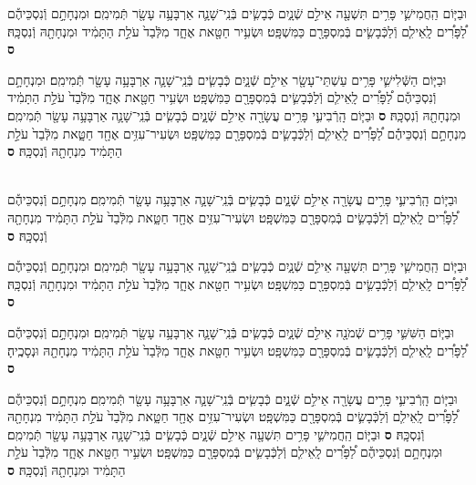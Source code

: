 \documentclass[twoside, openany, parskip=half, 11pt]{book}
\begin{document}
\begin{sometimes}
\begin{footnotesize}
\begin{multicols}{2}
וּבַיּ֧וֹם הַֽחֲמִישִׁ֛י פָּרִ֥ים תִּשְׁעָ֖ה אֵילִ֣ם שְֿׁנָ֑יִם כְּֿבָשִׂ֧ים בְּֿנֵֽי־שָׁנָ֛ה אַרְבָּעָ֥ה עָשָׂ֖ר תְּֿמִימִֽם׃ וּמִנְחָתָ֣ם וְֿנִסְכֵּיהֶ֡ם לַ֠פָּרִ֠ים לָֽאֵילִ֧ם וְֿלַכְּֿבָשִׂ֛ים בְּֿמִסְפָּרָ֖ם כַּמִּשְׁפָּֽט׃ וּשְׂעִ֥יר חַטָּ֖את אֶחָ֑ד מִלְּֿבַד֙ עֹלַ֣ת הַתָּמִ֔יד וּמִנְחָתָ֖הּ וְֿנִסְכָּֽהּ׃ \textbf{ס}

וּבַיּ֧וֹם הַשְּֿׁלִישִׁ֛י פָּרִ֥ים עַשְׁתֵּי־עָשָׂ֖ר אֵילִ֣ם שְֿׁנָ֑יִם כְּֿבָשִׂ֧ים בְּֿנֵֽי־שָׁנָ֛ה אַרְבָּעָ֥ה עָשָׂ֖ר תְּֿמִימִֽם׃ וּמִנְחָתָ֣ם וְֿנִסְכֵּיהֶ֡ם לַ֠פָּרִ֠ים לָֽאֵילִ֧ם וְֿלַכְּֿבָשִׂ֛ים בְּֿמִסְפָּרָ֖ם כַּמִּשְׁפָּֽט׃ וּשְׂעִ֥יר חַטָּ֖את אֶחָ֑ד מִלְּֿבַד֙ עֹלַ֣ת הַתָּמִ֔יד וּמִנְחָתָ֖הּ וְֿנִסְכָּֽהּ׃ \textbf{ס}
וּבַיּ֧וֹם הָֽרְֿבִיעִ֛י פָּרִ֥ים עֲשָׂרָ֖ה אֵילִ֣ם שְֿׁנָ֑יִם כְּֿבָשִׂ֧ים בְּֿנֵֽי־שָׁנָ֛ה אַרְבָּעָ֥ה עָשָׂ֖ר תְּֿמִימִֽם׃ מִנְחָתָ֣ם וְֿנִסְכֵּיהֶ֡ם לַ֠פָּרִ֠ים לָֽאֵילִ֧ם וְֿלַכְּֿבָשִׂ֛ים בְּֿמִסְפָּרָ֖ם כַּמִּשְׁפָּֽט׃ וּשְׂעִיר־עִזִּ֥ים אֶחָ֖ד חַטָּ֑את מִלְּֿבַד֙ עֹלַ֣ת הַתָּמִ֔יד מִנְחָתָ֖הּ וְֿנִסְכָּֽהּ׃ \textbf{ס}

\\
וּבַיּ֧וֹם הָֽרְֿבִיעִ֛י פָּרִ֥ים עֲשָׂרָ֖ה אֵילִ֣ם שְֿׁנָ֑יִם כְּֿבָשִׂ֧ים בְּֿנֵֽי־שָׁנָ֛ה אַרְבָּעָ֥ה עָשָׂ֖ר תְּֿמִימִֽם׃ מִנְחָתָ֣ם וְֿנִסְכֵּיהֶ֡ם לַ֠פָּרִ֠ים לָֽאֵילִ֧ם וְֿלַכְּֿבָשִׂ֛ים בְּֿמִסְפָּרָ֖ם כַּמִּשְׁפָּֽט׃ וּשְׂעִיר־עִזִּ֥ים אֶחָ֖ד חַטָּ֑את מִלְּֿבַד֙ עֹלַ֣ת הַתָּמִ֔יד מִנְחָתָ֖הּ וְֿנִסְכָּֽהּ׃ \textbf{ס}

וּבַיּ֧וֹם הַֽחֲמִישִׁ֛י פָּרִ֥ים תִּשְׁעָ֖ה אֵילִ֣ם שְֿׁנָ֑יִם כְּֿבָשִׂ֧ים בְּֿנֵֽי־שָׁנָ֛ה אַרְבָּעָ֥ה עָשָׂ֖ר תְּֿמִימִֽם׃ וּמִנְחָתָ֣ם וְֿנִסְכֵּיהֶ֡ם לַ֠פָּרִ֠ים לָֽאֵילִ֧ם וְֿלַכְּֿבָשִׂ֛ים בְּֿמִסְפָּרָ֖ם כַּמִּשְׁפָּֽט׃ וּשְׂעִ֥יר חַטָּ֖את אֶחָ֑ד מִלְּֿבַד֙ עֹלַ֣ת הַתָּמִ֔יד וּמִנְחָתָ֖הּ וְֿנִסְכָּֽהּ׃ \textbf{ס}

וּבַיּ֧וֹם הַשִּׁשִּׁ֛י פָּרִ֥ים שְֿׁמֹנָ֖ה אֵילִ֣ם שְֿׁנָ֑יִם כְּֿבָשִׂ֧ים בְּֿנֵֽי־שָׁנָ֛ה אַרְבָּעָ֥ה עָשָׂ֖ר תְּֿמִימִֽם׃ וּמִנְחָתָ֣ם וְֿנִסְכֵּיהֶ֡ם לַ֠פָּרִ֠ים לָֽאֵילִ֧ם וְֿלַכְּֿבָשִׂ֛ים בְּֿמִסְפָּרָ֖ם כַּמִּשְׁפָּֽט׃ וּשְׂעִ֥יר חַטָּ֖את אֶחָ֑ד מִלְּֿבַד֙ עֹלַ֣ת הַתָּמִ֔יד מִנְחָתָ֖הּ וּנְסָכֶֽיהָ׃ \textbf{ס}

וּבַיּ֧וֹם הָֽרְֿבִיעִ֛י פָּרִ֥ים עֲשָׂרָ֖ה אֵילִ֣ם שְֿׁנָ֑יִם כְּֿבָשִׂ֧ים בְּֿנֵֽי־שָׁנָ֛ה אַרְבָּעָ֥ה עָשָׂ֖ר תְּֿמִימִֽם׃ מִנְחָתָ֣ם וְֿנִסְכֵּיהֶ֡ם לַ֠פָּרִ֠ים לָֽאֵילִ֧ם וְֿלַכְּֿבָשִׂ֛ים בְּֿמִסְפָּרָ֖ם כַּמִּשְׁפָּֽט׃ וּשְׂעִיר־עִזִּ֥ים אֶחָ֖ד חַטָּ֑את מִלְּֿבַד֙ עֹלַ֣ת הַתָּמִ֔יד מִנְחָתָ֖הּ וְֿנִסְכָּֽהּ׃ \textbf{ס}
וּבַיּ֧וֹם הַֽחֲמִישִׁ֛י פָּרִ֥ים תִּשְׁעָ֖ה אֵילִ֣ם שְֿׁנָ֑יִם כְּֿבָשִׂ֧ים בְּֿנֵֽי־שָׁנָ֛ה אַרְבָּעָ֥ה עָשָׂ֖ר תְּֿמִימִֽם׃ וּמִנְחָתָ֣ם וְֿנִסְכֵּיהֶ֡ם לַ֠פָּרִ֠ים לָֽאֵילִ֧ם וְֿלַכְּֿבָשִׂ֛ים בְּֿמִסְפָּרָ֖ם כַּמִּשְׁפָּֽט׃ וּשְׂעִ֥יר חַטָּ֖את אֶחָ֑ד מִלְּֿבַד֙ עֹלַ֣ת הַתָּמִ֔יד וּמִנְחָתָ֖הּ וְֿנִסְכָּֽהּ׃ \textbf{ס}


\end{multicols}
\end{footnotesize}
\end{sometimes}
\end{document}
